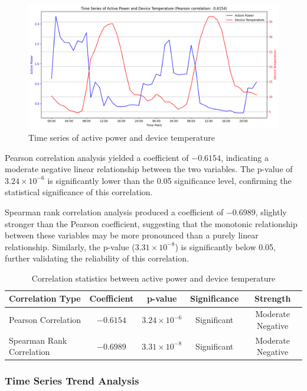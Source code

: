 \documentclass[12pt]{article}
\begin{document}
\begin{figure}[t]
    \centering
    \includegraphics[width=0.85\linewidth]{picture/Active Power and Device Temperature.png}
    \caption{Time series of active power and device temperature}
    \label{fig:timeseries}
\end{figure}

Pearson correlation analysis yielded a coefficient of $-0.6154$, indicating a moderate negative linear relationship between the two variables. The p-value of $3.24 \times 10^{-6}$ is significantly lower than the 0.05 significance level, confirming the statistical significance of this correlation.

Spearman rank correlation analysis produced a coefficient of $-0.6989$, slightly stronger than the Pearson coefficient, suggesting that the monotonic relationship between these variables may be more pronounced than a purely linear relationship. Similarly, the p-value ($3.31 \times 10^{-8}$) is significantly below 0.05, further validating the reliability of this correlation.

\begin{table}[t]
    \centering
    \caption{Correlation statistics between active power and device temperature}
    \label{tab:correlation}
    \begin{tabular}{lcccc}
        \toprule
        \textbf{Correlation Type} & \textbf{Coefficient} & \textbf{p-value} & \textbf{Significance} & \textbf{Strength} \\
        \midrule
        Pearson Correlation & $-0.6154$ & $3.24 \times 10^{-6}$ & Significant & Moderate Negative \\
        Spearman Rank Correlation & $-0.6989$ & $3.31 \times 10^{-8}$ & Significant & Moderate Negative \\
        \bottomrule
    \end{tabular}
\end{table}

\subsubsection*{Time Series Trend Analysis}
\end{document}
